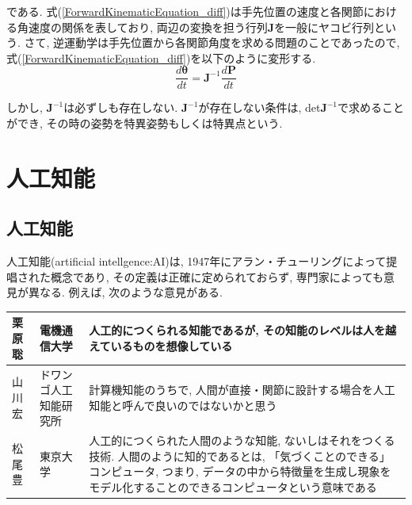 \documentclass{suribt}
\begin{document}
である. 式(\ref{ForwardKinematicEquation_diff})は手先位置の速度と各関節における角速度の関係を表しており, 両辺の変換を担う行列${\bm J}$を一般にヤコビ行列という. 
さて, 逆運動学は手先位置から各関節角度を求める問題のことであったので, 式(\ref{ForwardKinematicEquation_diff})を以下のように変形する.
\begin{equation}
	\label{ForwardKinematicEquation_diff}
	\frac{d{\bm \theta}}{dt} = {\bm J}^{-1}\frac{d{\bm P}}{dt}
\end{equation}

しかし, ${\bm J^{-1}}$は必ずしも存在しない. ${\bm J^{-1}}$が存在しない条件は, det${\bm J^{-1}}$で求めることができ, その時の姿勢を特異姿勢もしくは特異点という. 


\chapter{人工知能}

\section{人工知能}
人工知能(artificial intellgence:AI)は, 1947年にアラン・チューリングによって提唱された概念であり, その定義は正確に定められておらず, 専門家によっても意見が異なる. 例えば, 次のような意見がある.

\begin{table}[htb]
	\begin{tabular}{l|l|p{7cm}}
		\hline
		栗原聡 & 電機通信大学 & 人工的につくられる知能であるが, その知能のレベルは人を越えているものを想像している \\ \hline
		山川宏 & ドワンゴ人工知能研究所 & 計算機知能のうちで, 人間が直接・関節に設計する場合を人工知能と呼んで良いのではないかと思う \\ \hline
		松尾豊 & 東京大学 & 人工的につくられた人間のような知能, ないしはそれをつくる技術. 人間のように知的であるとは, 「気づくことのできる」コンピュータ, つまり, データの中から特徴量を生成し現象をモデル化することのできるコンピュータという意味である \\
		\hline
	\end{tabular}
\end{table}
\end{document}
